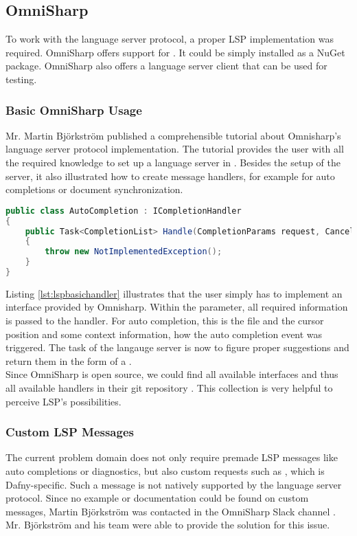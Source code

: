 \subsection{OmniSharp}
\label{section:analysis:omnisharp}
To work with the language server protocol, a proper LSP implementation was required. OmniSharp offers support for \Csharp \cite{langserverdotorg}. It could be simply installed as a NuGet package. OmniSharp also offers a language server client that can be used for testing.

\subsubsection{Basic OmniSharp Usage}
Mr. Martin Björkström published a comprehensible tutorial about Omnisharp's language server protocol implementation. The tutorial provides the user with all the required knowledge to set up a language server in \Csharp. Besides the setup of the server, it also illustrated how to create message handlers, for example for auto completions or document synchronization.

\begin{lstlisting}[language=csharp, caption={LSP Handler Implementation}, captionpos=b, label={lst:lspbasichandler}]
public class AutoCompletion : ICompletionHandler
{
    public Task<CompletionList> Handle(CompletionParams request, CancellationToken cancellationToken)
    {
        throw new NotImplementedException();
    }
}
\end{lstlisting}

Listing \ref{lst:lspbasichandler} illustrates that the user simply has to implement an interface provided by Omnisharp. Within the  parameter, all required information is passed to the handler. For auto completion, this is the file and the cursor position and some context information, how the auto completion event was triggered. The task of the langauge server is now to figure proper suggestions and return them in the form of a .\\

Since OmniSharp is open source, we could find all available interfaces and thus all available handlers in their git repository \cite{omnisharpgit}. This collection is very helpful to perceive LSP's possibilities.

\subsubsection{Custom LSP Messages}
The current problem domain does not only require premade LSP messages like auto completions or diagnostics, but also custom requests such as , which is Dafny-specific. Such a message is not natively supported by the language server protocol. Since no example or documentation could be found on custom messages, Martin Bj\"orkstr\"om was contacted in the OmniSharp Slack channel \cite{omnisharpslack}. Mr. Bj\"orkstr\"om and his team were able to provide the solution for this issue.\\

